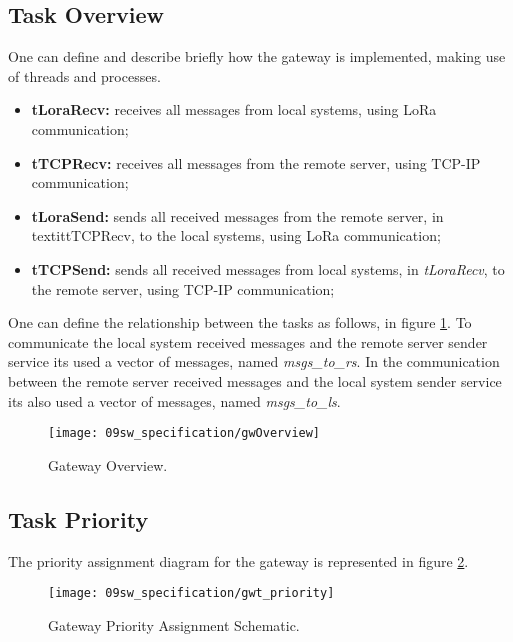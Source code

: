 \subsection{Task Overview}
One can define and describe briefly how the gateway is implemented, making use of threads and processes.

\begin{itemize}
	\item \textbf{tLoraRecv: } receives all messages from local systems, using LoRa communication;
	\item \textbf{tTCPRecv: } receives all messages from the remote server, using TCP-IP communication;	
	\item \textbf{tLoraSend: } sends all received messages from the remote server, in textit{tTCPRecv}, to the local systems, using LoRa communication;
	\item \textbf{tTCPSend: } sends all received messages from local systems, in \textit{tLoraRecv}, to the remote server, using TCP-IP communication;
\end{itemize}

One can define the relationship between the tasks as follows, in figure \ref{fig:gwOverview}. To communicate the local system received messages and the remote server sender service its used a vector of messages, named \textit{msgs\_to\_rs}. In the communication between the remote server received messages and the local system sender service its also used a vector of messages, named \textit{msgs\_to\_ls}.

\begin{figure}[H]
	\centering
	\texttt{[image: 09sw\_specification/gwOverview]}
	\caption{Gateway Overview.}
	\label{fig:gwOverview}
\end{figure}

\clearpage
\subsection{Task Priority}
The priority assignment diagram for the gateway is represented in figure \ref{fig:gwt_priority}.

\begin{figure}[H]
	\centering
	\texttt{[image: 09sw\_specification/gwt\_priority]}
	\caption{Gateway Priority Assignment Schematic.}
	\label{fig:gwt_priority}
\end{figure}

